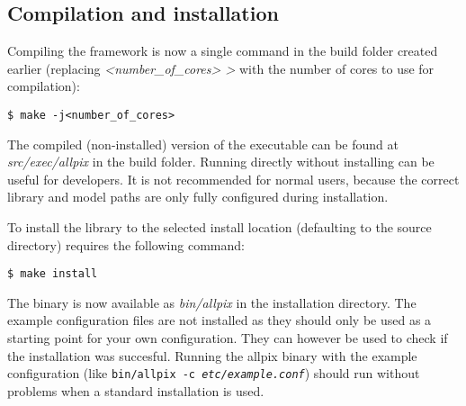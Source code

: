 \subsection{Compilation and installation}
Compiling the framework is now a single command in the build folder created earlier (replacing \textit{\textless number\_of\_cores> \textgreater} with the number of cores to use for compilation):
\begin{verbatim}
$ make -j<number_of_cores>
\end{verbatim}
The compiled (non-installed) version of the executable can be found at \textit{src/exec/allpix} in the build folder. Running \apsq directly without installing can be useful for developers. It is not recommended for normal users, because the correct library and model paths are only fully configured during installation.

To install the library to the selected install location (defaulting to the source directory) requires the following command:
\begin{verbatim}
$ make install
\end{verbatim}

The binary is now available as \textit{bin/allpix} in the installation directory. The example configuration files are not installed as they should only be used as a starting point for your own configuration. They can however be used to check if the installation was succesful. Running the allpix binary with the example configuration (like \texttt{bin/allpix -c \textit{etc/example.conf}}) should run without problems when a standard installation is used.
